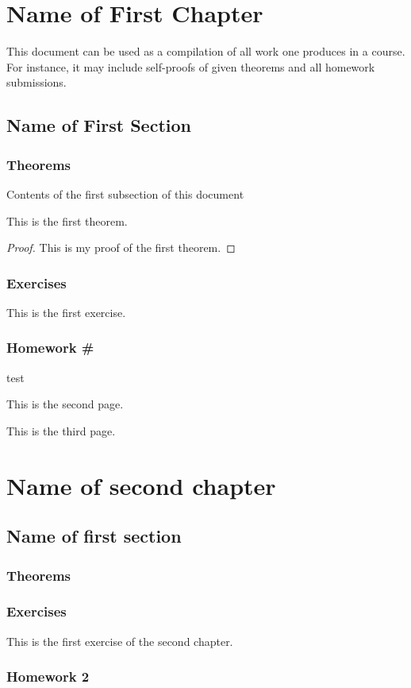 \documentclass[11pt, a4paper]{book}
\begin{document}
%

%
\tableofcontents
\thispagestyle{empty}
\newpage
\setcounter{page}{1}
%
\chapter{Name of First Chapter}
This document can be used as a compilation of all work one produces in a course. For instance, it may include self-proofs of given theorems and all homework submissions. 
%
\section{Name of First Section}
%
\subsection{Theorems}
Contents of the first subsection of this document
\begin{theorem}
    This is the first theorem.
\end{theorem}
\begin{proof}
    This is my proof of the first theorem.
\end{proof}
%
\subsection{Exercises}
\begin{exercise}
This is the first exercise.
\end{exercise}
%
\edef\InitialExerciseValue{\arabic{exercise}}
\setcounter{HWNumber}{1}
\subsection{Homework \#}
\setcounter{homework}{0}
\begingroup
    \renewcommand{\theexercise}{H.\arabic{HWNumber}.\arabic{exercise}}
\endgroup
\setcounter{exercise}{\InitialExerciseValue}
\begin{exercise}
    test
\end{exercise}
\newpage
This is the second page.

\newpage
This is the third page.
%
\chapter{Name of second chapter}
%
\section{Name of first section}
\subsection{Theorems}
\subsection{Exercises}
\begin{exercise}
    This is the first exercise of the second chapter.
\end{exercise}
\subsection{Homework 2}
\end{document}
